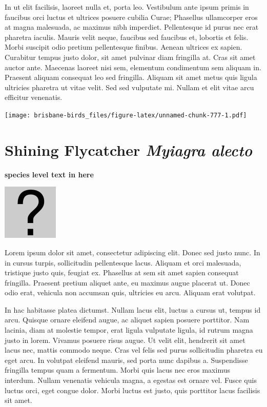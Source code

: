 \documentclass[]{book}
\let\origfigure\figure
\let\endorigfigure\endfigure
\renewenvironment{figure}[1][2] {
  \expandafter\origfigure\expandafter[H]
} {
  \endorigfigure
}
\begin{document}
In ut elit facilisis, laoreet nulla et, porta leo. Vestibulum ante ipsum
primis in faucibus orci luctus et ultrices posuere cubilia Curae;
Phasellus ullamcorper eros at magna malesuada, ac maximus nibh
imperdiet. Pellentesque id purus nec erat pharetra iaculis. Mauris velit
neque, faucibus sed faucibus et, lobortis et felis. Morbi suscipit odio
pretium pellentesque finibus. Aenean ultrices ex sapien. Curabitur
tempus justo dolor, sit amet pulvinar diam fringilla at. Cras sit amet
auctor ante. Maecenas laoreet nisi sem, elementum condimentum sem
aliquam in. Praesent aliquam consequat leo sed fringilla. Aliquam sit
amet metus quis ligula ultricies pharetra ut vitae velit. Sed sed
vulputate mi. Nullam et elit vitae arcu efficitur venenatis.

\begin{figure}
\centering
\texttt{[image: brisbane-birds\_files/figure-latex/unnamed-chunk-777-1.pdf]}
\caption{\label{fig:unnamed-chunk-777}insert figure caption}
\end{figure}

\section{\texorpdfstring{Shining Flycatcher \emph{Myiagra
alecto}}{Shining Flycatcher Myiagra alecto}}\label{shining-flycatcher-myiagra-alecto}

\textbf{species level text in here}

\begin{figure}
\centering
\includegraphics{assets/missing.png}
\caption{No image for species}
\end{figure}

Lorem ipsum dolor sit amet, consectetur adipiscing elit. Donec sed justo
nunc. In in cursus turpis, sollicitudin pellentesque lacus. Aliquam et
orci malesuada, tristique justo quis, feugiat ex. Phasellus at sem sit
amet sapien consequat fringilla. Praesent pretium aliquet ante, eu
maximus augue placerat ut. Donec odio erat, vehicula non accumsan quis,
ultricies eu arcu. Aliquam erat volutpat.

In hac habitasse platea dictumst. Nullam lacus elit, luctus a cursus ut,
tempus id arcu. Quisque ornare eleifend augue, ac aliquet sapien posuere
porttitor. Nam lacinia, diam at molestie tempor, erat ligula vulputate
ligula, id rutrum magna justo in lorem. Vivamus posuere risus augue. Ut
velit elit, hendrerit sit amet lacus nec, mattis commodo neque. Cras vel
felis sed purus sollicitudin pharetra eu eget arcu. In volutpat eleifend
mauris, sed porta nunc dapibus a. Suspendisse fringilla tempus quam a
fermentum. Morbi quis lacus nec eros maximus interdum. Nullam venenatis
vehicula magna, a egestas est ornare vel. Fusce quis luctus orci, eget
congue dolor. Morbi luctus est justo, quis porttitor lacus facilisis sit
amet.
\end{document}
